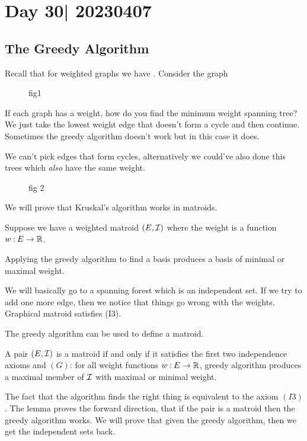 \documentclass[12pt]{memoir}
\begin{document}
 \section{Day 30| 20230407}

 \subsection{The Greedy Algorithm}

 Recall that for weighted graphs we have . Consider the graph
\begin{figure}
    fig1
\end{figure}
If each graph has a weight, how do you find the minimum weight spanning tree? We just take the lowest weight edge that doesn't form a cycle and then continue. Sometimes the greedy algorithm doesn't work but in this case it does.\par
We can't pick edges that form cycles, alternatively we could've also done this trees which \emph{also} have the same weight.
\begin{figure}
fig 2
\end{figure}
We will prove that Kruskal's algorithm works in matroids. 

\begin{Lem}
    Suppose we have a weighted matroid $(E,\mathcal{I})$ where the weight is a function $w\mathbin{:} E\to\mathbb{R}$.\par 
    Applying the greedy algorithm to find a basis produces a basis of minimal or maximal weight. 
\end{Lem}

We will basically go to a spanning forest which is an independent set. If we try to add one more edge, then we notice that things go wrong with the weights. Graphical matroid satisfies (I3).\par 
The greedy algorithm can be used to define a matroid.

\begin{Th}
    A pair $(E,\mathcal{I})$ is a matroid if and only if it satisfies the first two independence axioms and $(G)$: for all weight functions $w\mathbin{:} E\to\mathbb{R}$, greedy algorithm produces a maximal member of $\mathcal{I}$ with maximal or minimal weight. 
\end{Th}
The fact that the algorithm finds the right thing is equivalent to the axiom $(I3)$. The lemma proves the forward direction, that if the pair is a matroid then the greedy algorithm works. We will prove that given the greedy algorithm, then we get the independent sets back.
\end{document}
